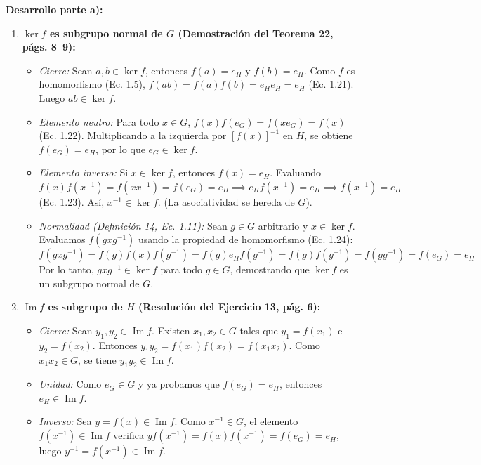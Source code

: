 \documentclass[11pt, a4paper]{article}
\begin{document}
\noindent \textbf{Desarrollo parte a):}
\begin{enumerate}[label=\arabic*.]
    \item \textbf{$\ker f$ es subgrupo normal de $G$ (Demostración del Teorema 22, págs. 8--9):}
    \begin{itemize}
        \item \textit{Cierre:} Sean $a, b \in \ker f$, entonces $f(a) = e_H$ y $f(b) = e_H$. Como $f$ es homomorfismo (Ec. 1.5), $f(ab) = f(a)f(b) = e_H e_H = e_H$ (Ec. 1.21). Luego $ab \in \ker f$.
        \item \textit{Elemento neutro:} Para todo $x \in G$, $f(x)f(e_G) = f(xe_G) = f(x)$ (Ec. 1.22). Multiplicando a la izquierda por $[f(x)]^{-1}$ en $H$, se obtiene $f(e_G) = e_H$, por lo que $e_G \in \ker f$.
        \item \textit{Elemento inverso:} Si $x \in \ker f$, entonces $f(x) = e_H$. Evaluando $f(x)f(x^{-1}) = f(xx^{-1}) = f(e_G) = e_H \implies e_H f(x^{-1}) = e_H \implies f(x^{-1}) = e_H$ (Ec. 1.23). Así, $x^{-1} \in \ker f$. (La asociatividad se hereda de $G$).
        \item \textit{Normalidad (Definición 14, Ec. 1.11):} Sean $g \in G$ arbitrario y $x \in \ker f$. Evaluamos $f(gxg^{-1})$ usando la propiedad de homomorfismo (Ec. 1.24):
        \[
        f(gxg^{-1}) = f(g)f(x)f(g^{-1}) = f(g) e_H f(g^{-1}) = f(g)f(g^{-1}) = f(gg^{-1}) = f(e_G) = e_H
        \]
        Por lo tanto, $gxg^{-1} \in \ker f$ para todo $g \in G$, demostrando que $\ker f$ es un subgrupo normal de $G$.
    \end{itemize}
    \item \textbf{$\operatorname{Im} f$ es subgrupo de $H$ (Resolución del Ejercicio 13, pág. 6):}
    \begin{itemize}
        \item \textit{Cierre:} Sean $y_1, y_2 \in \operatorname{Im} f$. Existen $x_1, x_2 \in G$ tales que $y_1 = f(x_1)$ e $y_2 = f(x_2)$. Entonces $y_1 y_2 = f(x_1)f(x_2) = f(x_1 x_2)$. Como $x_1 x_2 \in G$, se tiene $y_1 y_2 \in \operatorname{Im} f$.
        \item \textit{Unidad:} Como $e_G \in G$ y ya probamos que $f(e_G) = e_H$, entonces $e_H \in \operatorname{Im} f$.
        \item \textit{Inverso:} Sea $y = f(x) \in \operatorname{Im} f$. Como $x^{-1} \in G$, el elemento $f(x^{-1}) \in \operatorname{Im} f$ verifica $y f(x^{-1}) = f(x)f(x^{-1}) = f(e_G) = e_H$, luego $y^{-1} = f(x^{-1}) \in \operatorname{Im} f$.
    \end{itemize}
\end{enumerate}
\end{document}
